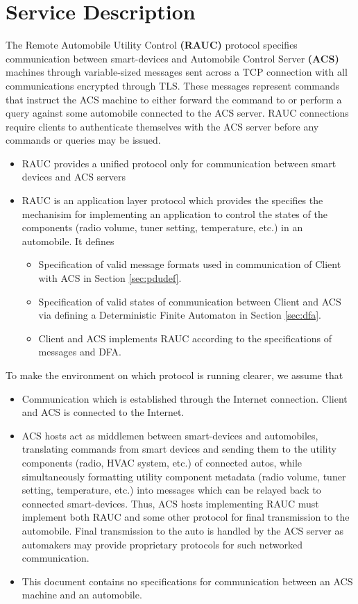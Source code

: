 
\section{Service Description}
\label{sec:serv_desc}

The Remote Automobile Utility Control \textbf{(RAUC)} protocol specifies communication between smart-devices and Automobile Control Server \textbf{(ACS)} machines through variable-sized messages sent across a TCP connection with all communications encrypted through TLS. These messages represent commands that instruct the ACS machine to either forward the command to or perform a query against some automobile connected to the ACS server. RAUC connections require clients to authenticate themselves with the ACS server before any commands or queries may be issued.
\begin{itemize}
\item  RAUC provides a unified protocol only for communication between smart devices and ACS servers
\item RAUC is  an application layer protocol which provides the specifies the mechanisim for implementing an application to control the states of the components (radio volume, tuner setting, temperature, etc.) in an automobile. It defines 
\begin{itemize}
\item Specification of valid message formats used in communication of Client with ACS in Section \ref{sec:pdudef}.
\item Specification of valid states of communication between Client and ACS via defining a Deterministic Finite Automaton in Section \ref{sec:dfa}. 
\item Client and ACS implements RAUC according to the specifications of messages and DFA.
\end{itemize}
\end{itemize}

To make the environment on which protocol is running clearer, we assume that 
\begin{itemize}
\item Communication which is established through the Internet connection. Client and ACS is connected to the Internet.
\item ACS hosts act as middlemen between smart-devices and automobiles, translating commands from smart devices and sending them to the utility components (radio, HVAC system, etc.) of connected autos, while simultaneously formatting utility component metadata (radio volume, tuner setting, temperature, etc.) into messages which can be relayed back to connected smart-devices.  Thus, ACS hosts implementing RAUC must implement both RAUC and some other protocol for final transmission to the automobile. Final transmission to the auto is handled by the ACS server as automakers may provide proprietary protocols for such networked communication. 
\item This document contains no specifications for communication between an ACS machine and an automobile.
\end{itemize}


